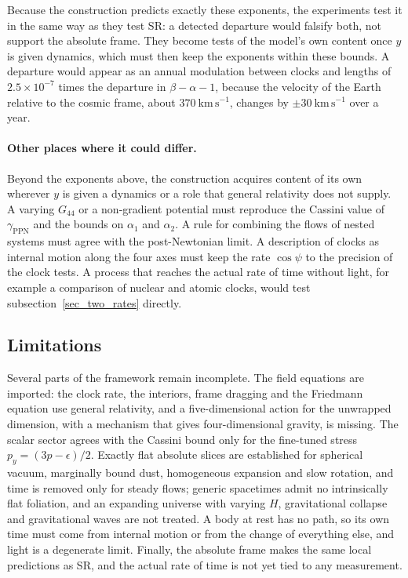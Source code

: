 \documentclass[anonymous]{iopjournal}
\begin{document}
Because the construction predicts exactly these exponents, the experiments test it in the same way as they test SR: a detected departure would falsify both, not support the absolute frame. They become tests of the model's own content once $y$ is given dynamics, which must then keep the exponents within these bounds. A departure would appear as an annual modulation between clocks and lengths of $2.5\times10^{-7}$ times the departure in $\beta-\alpha-1$, because the velocity of the Earth relative to the cosmic frame, about $370~\mathrm{km\,s^{-1}}$, changes by $\pm30~\mathrm{km\,s^{-1}}$ over a year.

\paragraph{Other places where it could differ.} Beyond the exponents above, the construction acquires content of its own wherever $y$ is given a dynamics or a role that general relativity does not supply. A varying $G_{44}$ or a non-gradient potential must reproduce the Cassini value of $\gamma_{\mathrm{PPN}}$ and the bounds on $\alpha_1$ and $\alpha_2$. A rule for combining the flows of nested systems must agree with the post-Newtonian limit. A description of clocks as internal motion along the four axes must keep the rate $\cos\psi$ to the precision of the clock tests. A process that reaches the actual rate of time without light, for example a comparison of nuclear and atomic clocks, would test subsection~\ref{sec_two_rates} directly.

\subsection{Limitations}

Several parts of the framework remain incomplete. The field equations are imported: the clock rate, the interiors, frame dragging and the Friedmann equation use general relativity, and a five-dimensional action for the unwrapped dimension, with a mechanism that gives four-dimensional gravity, is missing. The scalar sector agrees with the Cassini bound only for the fine-tuned stress $p_y=(3p-\epsilon)/2$. Exactly flat absolute slices are established for spherical vacuum, marginally bound dust, homogeneous expansion and slow rotation, and time is removed only for steady flows; generic spacetimes admit no intrinsically flat foliation, and an expanding universe with varying $H$, gravitational collapse and gravitational waves are not treated. A body at rest has no path, so its own time must come from internal motion or from the change of everything else, and light is a degenerate limit. Finally, the absolute frame makes the same local predictions as SR, and the actual rate of time is not yet tied to any measurement.
\end{document}
